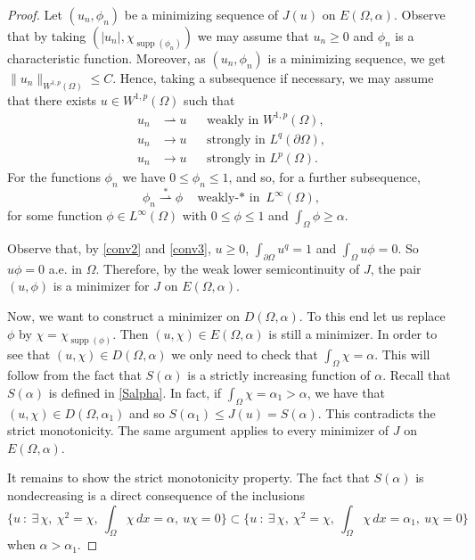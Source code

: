 \documentclass[11pt]{amsart}
\theoremstyle{remark}
\numberwithin{equation}{section}
\DeclareMathOperator{\supp}{supp}
\begin{document}
\begin{proof}
Let $(u_n,\phi_n)$ be a minimizing sequence of $J(u)$ on $E(\Omega,\alpha)$. Observe that by taking $(|u_n|,\chi_{\supp(\phi_n)})$ we may assume that $u_n\ge0$ and $\phi_n$ is a characteristic function. Moreover, as $(u_n,\phi_n)$ is a minimizing sequence, we get $\|u_n\|_{W^{1,p}(\Omega)}\le C$. Hence, taking a subsequence if necessary, we may assume that there exists $u\in W^{1,p}(\Omega)$ such that
\begin{equation}\label{conv2}
\begin{aligned}
u_n&\rightharpoonup u &&\text{weakly in } W^{1,p}(\Omega),\\
u_n&\to u &&\text{strongly in } L^q(\partial\Omega),\\
u_n&\to u &&\text{strongly in } L^p(\Omega).
\end{aligned}
\end{equation}
For the functions $\phi_n$ we have $0\le\phi_n\le1$, and so, for a further subsequence,
\begin{equation}\label{conv3}
\phi_n\overset{*}{\rightharpoonup}\phi\quad\text{weakly-$*$ in } L^\infty(\Omega),
\end{equation}
for some function $\phi\in L^\infty(\Omega)$ with $0\le\phi\le1$ and $\int_\Omega\phi\ge\alpha$.

Observe that, by \eqref{conv2} and \eqref{conv3}, $u\ge0$, $\int_{\partial\Omega}u^q=1$ and $\int_\Omega u\phi=0$. So $u\phi=0$ a.e. in $\Omega$. Therefore, by the weak lower semicontinuity of $J$, the pair $(u,\phi)$ is a minimizer for $J$ on $E(\Omega,\alpha)$.

Now, we want to construct a minimizer on $D(\Omega,\alpha)$. To this end let us replace $\phi$ by $\chi=\chi_{\supp(\phi)}$. Then $(u,\chi)\in E(\Omega,\alpha)$ is still a minimizer. In order to see that $(u,\chi)\in D(\Omega,\alpha)$ we only need to check that $\int_\Omega\chi=\alpha$. This will follow from the fact that $S(\alpha)$ is a strictly increasing function of $\alpha$. Recall that $S(\alpha)$ is defined in \eqref{Salpha}. In fact, if $\int_\Omega\chi=\alpha_1>\alpha$, we have that $(u,\chi)\in D(\Omega,\alpha_1)$ and so $S(\alpha_1)\le J(u)=S(\alpha)$. This contradicts the strict monotonicity. The same argument applies to every minimizer of $J$ on $E(\Omega,\alpha)$.

It remains to show the strict monotonicity property. The fact that $S(\alpha)$ is nondecreasing is a direct consequence of the inclusions
\[
\Big\{u\ :\ \exists\,\chi,\ \chi^2=\chi,\ \int_\Omega\chi\,dx=\alpha,\ u\chi=0\Big\}\subset\Big\{u\ :\ \exists\,\chi,\ \chi^2=\chi,\ \int_\Omega\chi\,dx=\alpha_1,\ u\chi=0\Big\}
\]
when $\alpha>\alpha_1$.


\end{proof}
\end{document}
